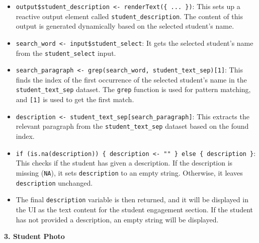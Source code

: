 \documentclass[
]{book}
\begin{document}
\begin{itemize}
\item
  \texttt{output\$student\_description\ \textless{}-\ renderText(\{\ ...\ \})}: This sets up a reactive output element called \texttt{student\_description}. The content of this output is generated dynamically based on the selected student's name.
\item
  \texttt{search\_word\ \textless{}-\ input\$student\_select}: It gets the selected student's name from the \texttt{student\_select} input.
\item
  \texttt{search\_paragraph\ \textless{}-\ grep(search\_word,\ student\_text\_sep){[}1{]}}: This finds the index of the first occurrence of the selected student's name in the \texttt{student\_text\_sep} dataset. The \texttt{grep} function is used for pattern matching, and \texttt{{[}1{]}} is used to get the first match.
\item
  \texttt{description\ \textless{}-\ student\_text\_sep{[}search\_paragraph{]}}: This extracts the relevant paragraph from the \texttt{student\_text\_sep} dataset based on the found index.
\item
  \texttt{if\ (is.na(description))\ \{\ description\ \textless{}-\ ""\ \}\ else\ \{\ description\ \}}: This checks if the student has given a description. If the description is missing (\texttt{NA}), it sets \texttt{description} to an empty string. Otherwise, it leaves \texttt{description} unchanged.
\item
  The final \texttt{description} variable is then returned, and it will be displayed in the UI as the text content for the student engagement section. If the student has not provided a description, an empty string will be displayed.
\end{itemize}

\textbf{3. Student Photo}
\end{document}
